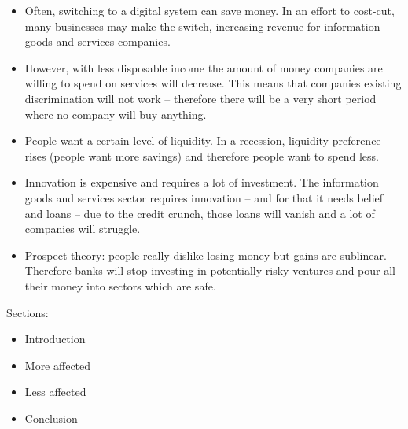 \documentclass[10pt, a4paper]{article}
\begin{document}
\begin{itemize}
\item Often, switching to a digital system can save money. In an effort to
cost-cut, many businesses may make the switch, increasing revenue for
information goods and services companies.

\item However, with less disposable income the amount of money companies are
willing to spend on services will decrease. This means that companies
existing discrimination will not work -- therefore there will be a very
short period where no company will buy anything.

\item People want a certain level of liquidity. In a recession, liquidity
preference rises (people want more savings) and therefore people want to spend
less.

\item Innovation is expensive and requires a lot of investment. The
information goods and services sector requires innovation -- and for that it
needs belief and loans -- due to the credit crunch, those loans will vanish
and a lot of companies will struggle.

\item Prospect theory: people really dislike losing money but gains are
sublinear. Therefore banks will stop investing in potentially risky ventures
and pour all their money into sectors which are safe.

\end{itemize}

Sections:

\begin{itemize}

\item Introduction

\item More affected

\item Less affected

\item Conclusion

\end{itemize}
\end{document}
